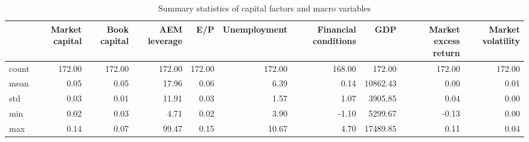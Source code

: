 \begin{table}
\caption{Summary statistics of capital factors and macro variables}
\label{tab:Table 2.1}
\begin{tabular}{lrrrrrrrrr}
\toprule
 & Market capital & Book capital & AEM leverage & E/P & Unemployment & Financial conditions & GDP & Market excess return & Market volatility \\
\midrule
count & 172.00 & 172.00 & 172.00 & 172.00 & 172.00 & 168.00 & 172.00 & 172.00 & 172.00 \\
mean & 0.05 & 0.05 & 17.96 & 0.06 & 6.39 & 0.14 & 10862.43 & 0.00 & 0.01 \\
std & 0.03 & 0.01 & 11.91 & 0.03 & 1.57 & 1.07 & 3905.85 & 0.04 & 0.00 \\
min & 0.02 & 0.03 & 4.71 & 0.02 & 3.90 & -1.10 & 5299.67 & -0.13 & 0.00 \\
max & 0.14 & 0.07 & 99.47 & 0.15 & 10.67 & 4.70 & 17489.85 & 0.11 & 0.04 \\
\bottomrule
\end{tabular}
\end{table}
